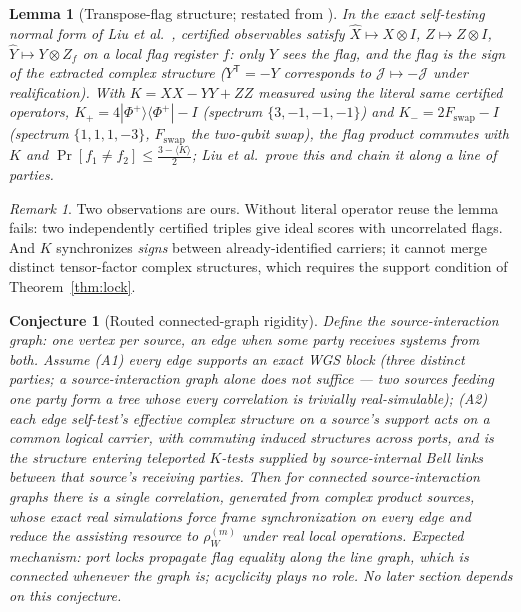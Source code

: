 \documentclass[11pt]{article}
\theoremstyle{plain}
\newtheorem{lemma}[theorem]{Lemma}
\theoremstyle{definition}
\theoremstyle{remark}
\newtheorem{remark}[theorem]{Remark}
\theoremstyle{plain}
\newtheorem{conjecture}[theorem]{Conjecture}
\newcommand{\cJ}{\mathcal{J}}
\begin{document}
\begin{lemma}[Transpose-flag structure; restated from
\cite{liu2026}]\label{lem:flag}
In the exact self-testing normal form of Liu et al.\
\cite{liu2026}, certified observables satisfy $\widehat X\mapsto
X\otimes I$, $\widehat Z\mapsto Z\otimes I$, $\widehat Y\mapsto
Y\otimes Z_{f}$ on a local flag register $f$: only $Y$ sees the
flag, and the flag is the sign of the extracted complex structure
($Y^{\mathsf T} = -Y$ corresponds to $\cJ\mapsto-\cJ$ under
realification). With $K = XX - YY + ZZ$ measured using the literal
same certified operators,
$K_+ = 4|\Phi^+\rangle\langle\Phi^+| - I$ (spectrum
$\{3,-1,-1,-1\}$) and $K_- = 2F_{\mathrm{swap}} - I$ (spectrum
$\{1,1,1,-3\}$, $F_{\mathrm{swap}}$ the two-qubit swap), the flag
product commutes with $K$ and
$\Pr[f_1\neq f_2]\le\tfrac{3-\langle K\rangle}2$; Liu et al.\
prove this and chain it along a line of parties.
\end{lemma}

\begin{remark}
Two observations are ours. Without literal operator reuse the
lemma fails: two independently certified triples give ideal scores
with uncorrelated flags. And $K$ synchronizes \emph{signs} between
already-identified carriers; it cannot merge distinct
tensor-factor complex structures, which requires the support
condition of Theorem~\ref{thm:lock}.
\end{remark}

\begin{conjecture}[Routed connected-graph rigidity]
\label{conj:routed}
Define the \emph{source-interaction graph}: one vertex per source,
an edge when some party receives systems from both. Assume (A1)
every edge supports an exact WGS block (three distinct parties; a
source-interaction graph alone does not suffice --- two sources
feeding one party form a tree whose every correlation is trivially
real-simulable); (A2) each edge self-test's effective complex
structure on a source's support acts on a common logical carrier,
with commuting induced structures across ports, and is the
structure entering teleported $K$-tests supplied by
source-internal Bell links between that source's receiving
parties. Then for connected source-interaction graphs there is a
single correlation, generated from complex product sources, whose
exact real simulations force frame synchronization on every edge
and reduce the assisting resource to $\rho^{(m)}_W$ under real
local operations. Expected mechanism: port locks propagate flag
equality along the line graph, which is connected whenever the
graph is; acyclicity plays no role. No later section depends on
this conjecture.
\end{conjecture}
\end{document}
